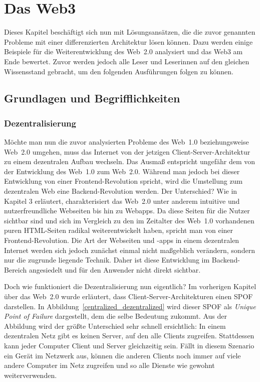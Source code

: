 \section{Das Web3}

Dieses Kapitel beschäftigt sich nun mit Lösungsansätzen, die die zuvor genannten Probleme mit einer differenzierten Architektur lösen können. Dazu werden einige Beispiele für die Weiterentwicklung des Web~2.0 analysiert und das Web3 am Ende bewertet. Zuvor werden jedoch alle Leser und Leserinnen auf den gleichen Wissensstand gebracht, um den folgenden Ausführungen folgen zu können.

\subsection{Grundlagen und Begrifflichkeiten}

\subsubsection{Dezentralisierung}

Möchte man nun die zuvor analysierten Probleme des Web~1.0 beziehungsweise Web~2.0 umgehen, muss das Internet von der jetzigen Client-Server-Architektur zu einem dezentralen Aufbau wechseln. Das Ausmaß entspricht ungefähr dem von der Entwicklung des Web~1.0 zum Web~2.0. Während man jedoch bei dieser Entwicklung von einer Frontend-Revolution spricht, wird die Umstellung zum dezentralen Web eine Backend-Revolution werden. Der Unterschied? Wie in Kapitel 3 erläutert, charakterisiert das Web~2.0 unter anderem intuitive und nutzerfreundliche Webseiten bis hin zu Webapps. Da diese Seiten für die Nutzer sichtbar sind und sich im Vergleich zu den im Zeitalter des Web~1.0 vorhandenen puren HTML-Seiten radikal weiterentwickelt haben, spricht man von einer Frontend-Revolution. Die Art der Webseiten und -apps in einem dezentralen Internet werden sich jedoch zunächst einmal nicht maßgeblich verändern, sondern nur die zugrunde liegende Technik. Daher ist diese Entwicklung im Backend-Bereich angesiedelt und für den Anwender nicht direkt sichtbar.

Doch wie funktioniert die Dezentralisierung nun eigentlich? Im vorherigen Kapitel über das Web~2.0 wurde erläutert, dass Client-Server-Architekturen einen SPOF darstellen. In Abbildung~\ref{centralized_dezentralized} wird dieser SPOF als \textit{Unique Point of Failure} dargestellt, dem die selbe Bedeutung zukommt. Aus der Abbildung wird der größte Unterschied sehr schnell ersichtlich: In einem dezentralen Netz gibt es keinen Server, auf den alle Clients zugreifen. Stattdessen kann jeder Computer Client und Server gleichzeitig sein. Fällt in diesem Szenario ein Gerät im Netzwerk aus, können die anderen Clients noch immer auf viele andere Computer im Netz zugreifen und so alle Dienste wie gewohnt weiterverwenden.

